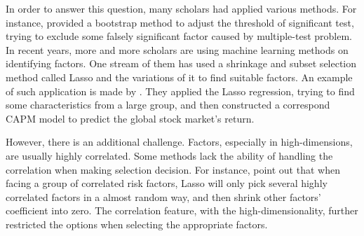 In order to answer this question, many scholars had applied various methods.
For instance,  provided a bootstrap method to adjust the threshold of significant test, trying to exclude some falsely significant factor caused by multiple-test problem.
In recent years, more and more scholars are using machine learning methods on identifying factors.
One stream of them has used a shrinkage and subset selection method called Lasso \cite{Tibshirani1996} and the variations of it to find suitable factors.
An example of such application is made by .
They applied the Lasso regression, trying to find some characteristics from a large group, and then constructed a correspond CAPM model to predict the global stock market's return.

However, there is an additional challenge.
Factors, especially in high-dimensions, are usually highly correlated.
Some methods lack the ability of handling the correlation when making selection decision.
For instance,  point out that when facing a group of correlated risk factors, Lasso will only pick several highly correlated factors in a almost random way, and then shrink other factors' coefficient into zero.
The correlation feature, with the high-dimensionality, further restricted the options when selecting the appropriate factors.

